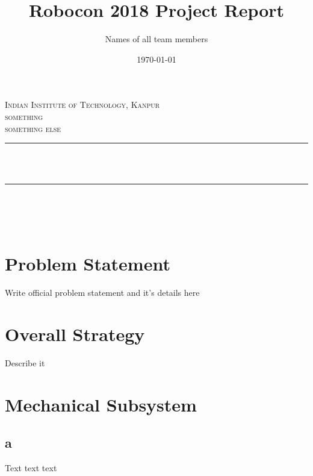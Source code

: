 \documentclass[11pt]{article}
\title{Robocon 2018 Project Report}%
\author{Names of all team members}%
\date{\today}%
\makeatletter
\let\thetitle\@title
\let\theauthor\@author
\let\thedate\@date
\makeatother
\begin{document}

\begin{titlepage}
    \centering
    \vspace*{0.5 cm}
    \textsc{\LARGE Indian Institute of Technology, Kanpur}\\[2.0 cm]   %
    \textsc{\Large something}\\[0.5 cm]               %
    \textsc{\large something else}\\[0.5 cm]               %
    \rule{\linewidth}{0.2 mm} \\[0.4 cm]
    { \huge \bfseries \thetitle}\\
    \rule{\linewidth}{0.2 mm} \\[0.5 cm]
    {\large \theauthor}\\[1 cm]
    {\large \thedate}\\[2 cm]
 
    \vfill
    
\end{titlepage}


\tableofcontents
\pagebreak


\section{Problem Statement}
Write official problem statement and it's details here

\pagebreak

\section{Overall Strategy}
Describe it \\

\pagebreak

\section{Mechanical Subsystem}
\subsection{a}
Text text text
\end{document}
